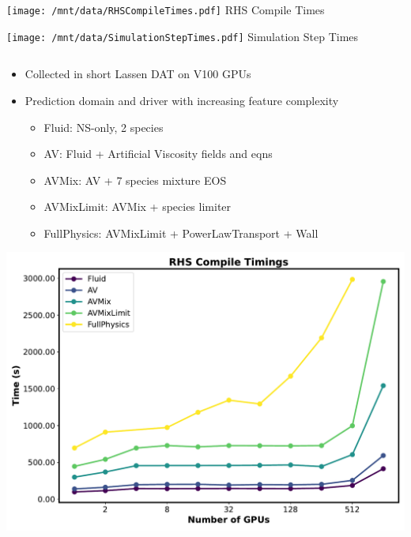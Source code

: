   \vfill
  
  \begin{minipage}[b]{0.45\textwidth}
    \texttt{[image: /mnt/data/RHSCompileTimes.pdf]}
    \centering
    \small RHS Compile Times
  \end{minipage}
  \hfill
  \begin{minipage}[b]{0.45\textwidth}
    \texttt{[image: /mnt/data/SimulationStepTimes.pdf]}
    \centering
    \small Simulation Step Times
  \end{minipage}

    \begin{columns}[T]  %
    \begin{column}{0.5\textwidth}
      \begin{itemize}
        \item Collected in short Lassen DAT on V100 GPUs
        \item Prediction domain and driver with increasing feature complexity
          \begin{itemize}
            \item Fluid: NS-only, 2 species
            \item AV: Fluid + Artificial Viscosity fields and eqns
            \item AVMix: AV + 7 species mixture EOS
            \item AVMixLimit: AVMix + species limiter
            \item FullPhysics: AVMixLimit + PowerLawTransport + Wall
          \end{itemize}
      \end{itemize}
      \includegraphics[width=\textwidth]{Figures/RHSCompileTimes.pdf}
    \end{column}
    

\end{columns}
